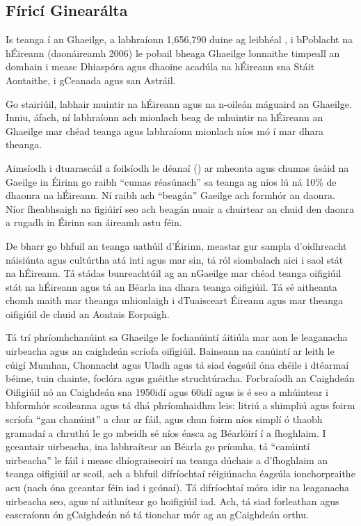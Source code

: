 \documentclass[]{../../metanetpaper}
\begin{document}
\begin{multicols}{2}

\subsection{Fíricí Ginearálta}

Is teanga í an Ghaeilge, a labhraíonn 1,656,790 duine ag leibhéal , i bPoblacht na hÉireann (daonáireamh 2006) le pobail bheaga Ghaeilge lonnaithe timpeall an domhain i measc Dhiaspóra agus dhaoine acadúla na hÉireann sna Stáit Aontaithe, i gCeanada agus san Astráil.

Go stairiúil, labhair muintir na hÉireann agus na n-oileán máguaird an Ghaeilge. Inniu, áfach, ní labhraíonn ach mionlach beag de mhuintir na hÉireann an Ghaeilge mar chéad teanga agus labhraíonn mionlach níos mó í mar dhara theanga.

Aimsíodh i dtuarascáil a foilsíodh le déanaí (\cite{pobail1})  ar mheonta agus chumas úsáid na Gaeilge in Éirinn go raibh ``cumas réasúnach'' sa teanga ag níos lú ná 10\% de dhaonra na hÉireann. Ní raibh ach ``beagán'' Gaeilge ach formhór an daonra. Níor fheabhsaigh na figiúirí seo ach beagán nuair a chuirtear an chuid den daonra a rugadh in Éirinn san áireamh astu féin.


De bharr go bhfuil an teanga uathúil d'Éirinn, meastar gur sampla d'oidhreacht náisiúnta agus cultúrtha atá inti agus mar sin, tá ról siombalach aici i saol stát na hÉireann. Tá stádas bunreachtúil ag an nGaeilge mar chéad teanga oifigiúil stát na hÉireann agus tá an Béarla ina dhara teanga oifigiúil. Tá sé aitheanta chomh maith mar theanga mhionlaigh i dTuaisceart Éireann agus mar theanga oifigiúil de chuid an Aontais Eorpaigh.

Tá trí phríomhchanúint sa Ghaeilge le fochanúintí áitiúla mar aon le leaganacha uirbeacha agus an caighdeán scríofa oifigiúil. Baineann na canúintí ar leith le cúigí Mumhan, Chonnacht agus Uladh agus tá siad éagsúil óna chéile i dtéarmaí béime, tuin chainte, foclóra agus gnéithe struchtúracha. Forbraíodh an Caighdeán Oifigiúil nó an Caighdeán sna 1950idí agus 60idí agus is é seo a mhúintear i bhformhór scoileanna agus tá dhá phríomhaidhm leis: litriú a shimpliú agus foirm scríofa ``gan chanúint'' a chur ar fáil, agus chun foirm níos simplí ó thaobh gramadaí a chruthú le go mbeidh sé níos éasca ag Béarlóirí í a fhoghlaim. I gceantair uirbeacha, ina labhraítear an Béarla go príomha, tá ``canúintí uirbeacha'' le fáil i measc dhíograiseoirí na teanga dúchais a d'fhoghlaim an teanga oifigiúil ar scoil, ach a bhfuil difríochtaí réigiúnacha éagsúla ionchorpraithe acu (nach óna gceantar féin iad i gcónaí). Tá difríochtaí móra idir na leaganacha uirbeacha seo, agus ní aithnítear go hoifigiúil iad. Ach, tá siad forleathan agus eascraíonn ón gCaighdeán nó tá tionchar mór ag an gCaighdeán orthu.




\end{multicols}
\end{document}
